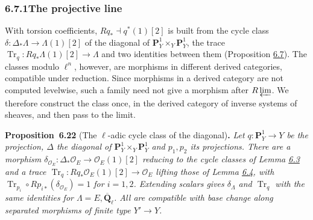 \documentclass[11pt]{article}
\newenvironment{bpstatement}[2]{\par\addvspace{0.6\baselineskip}\noindent\textbf{#1}#2\textbf{.}\enspace\ignorespaces}
  {\par\addvspace{0.4\baselineskip}}
\newenvironment{bpstatementit}[2]{\begin{bpstatement}{#1}{#2}\itshape\ignorespaces}{\end{bpstatement}}
\begin{document}
\subsubsection*{\texorpdfstring{6.7.1\quad The projective line}{6.7.1 The projective line}}
\label{bp67}%
\label{bp68}%
With torsion coefficients, \(Rq_*\dashv q^*(1)[2]\) is built from the cycle class \(\delta:\Delta_*\Lambda\to\Lambda(1)[2]\) of the diagonal of \(\mathbf P^1_Y\times_Y\mathbf P^1_Y\), the trace \(\operatorname{Tr}_q:Rq_*\Lambda(1)[2]\to\Lambda\) and two identities between them (Proposition \hyperref[bp22]{6.7}). The classes modulo \(\ell^n\), however, are morphisms in different derived categories, compatible under reduction. Since morphisms in a derived category are not computed levelwise, such a family need not give a morphism after \(R\varprojlim\). We therefore construct the class once, in the derived category of inverse systems of sheaves, and then pass to the limit.

\label{bp69}%
\begin{bpstatementit}{Proposition~6.22}{ (The $\ell$-adic cycle class of the diagonal)}
Let \(q:\mathbf P^1_Y\to Y\) be the projection, \(\Delta\) the diagonal of \(\mathbf P^1_Y\times_Y\mathbf P^1_Y\) and \(p_1,p_2\) its projections. There are a morphism \(\delta_{\mathcal O_E}:\Delta_*\mathcal O_E\to
\mathcal O_E(1)[2]\) reducing to the cycle classes of Lemma \hyperref[bp11]{6.3} and a trace \(\operatorname{Tr}_q:Rq_*\mathcal O_E(1)[2]\to\mathcal O_E\) lifting those of Lemma \hyperref[bp14]{6.4}, with \(\operatorname{Tr}_{p_i}\circ Rp_{i*}(\delta_{\mathcal O_E})=1\) for \(i=1,2\). Extending scalars gives \(\delta_\Lambda\) and \(\operatorname{Tr}_q\) with the same identities for \(\Lambda=E,\overline{\mathbf Q}_\ell\). All are compatible with base change along separated morphisms of finite type \(Y'\to Y\).
\end{bpstatementit}
\end{document}
